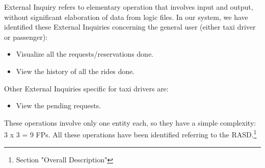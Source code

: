 External Inquiry refers to elementary operation that involves input and output, without significant elaboration of data from logic files.
\newline
In our system, we have identified these External Inquiries concerning the general user (either taxi driver or passenger):
\begin{itemize}
    \item Visualize all the requests/reservations done. 
	\item View the history of all the rides done. 
\end{itemize}

Other External Inquiries specific for taxi drivers are:
\begin{itemize}
    \item View the pending requests. 
\end{itemize}
These operations involve only one entity each, so they have a simple complexity: 3 x 3 = 9 FPs.
\newline
All these operations have been identified referring to the RASD.\footnote{Section "Overall Description"}